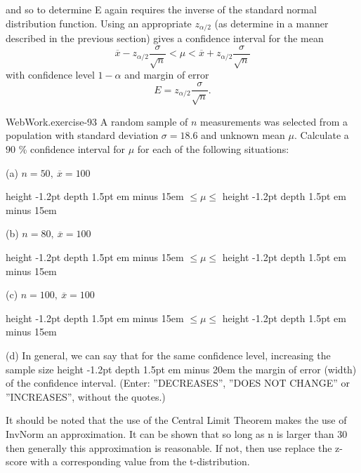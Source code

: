 \documentclass[10pt,]{book}
\newcommand{\fillin}[1]{\leavevmode\leaders\vrule height -1.2pt depth 1.5pt \hskip #1em minus #1em \null}
\numberwithin{equation}{section}
\newcommand{\lt}{<}
\begin{document}
and so to determine E again requires the inverse of the standard normal distribution function.  Using an appropriate \(z_{\alpha /2}\) (as determine in a manner described in the previous section) gives a confidence interval for the mean%
\begin{equation*}
\overline{x} - z_{\alpha / 2} \frac{\sigma}{\sqrt{n}} \lt \mu \lt \overline{x} + z_{\alpha / 2} \frac{\sigma}{\sqrt{n}}
\end{equation*}
with confidence level \(1-\alpha\) and margin of error%
\begin{equation*}
E = z_{\alpha /2} \frac{\sigma}{\sqrt{n}}.
\end{equation*}
%
\par
\hypertarget{p-1385}{}%
\begin{inlineexercise}{WebWork.}{exercise-93}%
\hypertarget{p-1386}{}%
A random sample of \(n\) measurements was selected from a population with standard deviation \(\sigma = 18.6\) and unknown mean \(\mu\). Calculate a \(90\) \% confidence interval for \(\mu\) for each of the following situations:%
\par
\hypertarget{p-1387}{}%
(a) \(n = 50, \ \overline{x} = 100\)%
\par
\hypertarget{p-1388}{}%
 \fillin{15} \(\leq \mu \leq\)  \fillin{15}%
\par
\hypertarget{p-1389}{}%
(b)  \(n = 80, \ \overline{x} = 100\)%
\par
\hypertarget{p-1390}{}%
 \fillin{15} \(\leq \mu \leq\)  \fillin{15}%
\par
\hypertarget{p-1391}{}%
(c)  \(n = 100, \ \overline{x} = 100\)%
\par
\hypertarget{p-1392}{}%
 \fillin{15} \(\leq \mu \leq\)  \fillin{15}%
\par
\hypertarget{p-1393}{}%
(d)  In general, we can say that for the same confidence level, increasing the sample size  \fillin{20} the margin of error (width) of the confidence interval.  (Enter: ''DECREASES'', ''DOES NOT CHANGE'' or ''INCREASES'', without the quotes.)%
\end{inlineexercise}
%
\par
\hypertarget{p-1394}{}%
It should be noted that the use of the Central Limit Theorem makes the use of  InvNorm an approximation. It can be shown that so long as n is larger than 30 then generally this approximation is reasonable. If not, then use replace the z-score with a corresponding value from the t-distribution.%
\par
\hypertarget{p-1395}{}%
\end{document}
